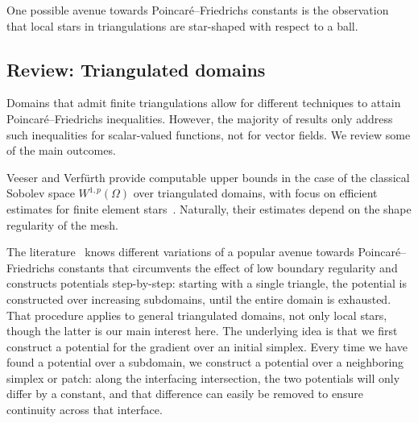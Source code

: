 One possible avenue towards Poincar\'e--Friedrichs constants is the observation that local stars in triangulations are star-shaped with respect to a ball.









\subsection{Review: Triangulated domains}

Domains that admit finite triangulations allow for different techniques to attain Poincar\'e--Friedrichs inequalities. 
However, the majority of results only address such inequalities for scalar-valued functions, not for vector fields. 
We review some of the main outcomes. 

Veeser and Verf\"urth provide computable upper bounds in the case of the classical Sobolev space $W^{1,p}(\Omega)$ over triangulated domains, with focus on efficient estimates for finite element stars~\cite{veeser2012poincare}. Naturally, their estimates depend on the shape regularity of the mesh.

The literature~\cite{Eym_Gal_Her_00,vohralik2005discrete,ern2020stable,ern2021finite,Chaum_Voh_p_rob_3D_H_curl_23,Voh_loc_glob_H1_24} knows different variations of a popular avenue towards Poincar\'e--Friedrichs constants that circumvents the effect of low boundary regularity and constructs potentials step-by-step: 
starting with a single triangle, the potential is constructed over increasing subdomains, until the entire domain is exhausted. 
That procedure applies to general triangulated domains, not only local stars, though the latter is our main interest here. 
The underlying idea is that we first construct a potential for the gradient over an initial simplex. 
Every time we have found a potential over a subdomain, we construct a potential over a neighboring simplex or patch:
along the interfacing intersection, the two potentials will only differ by a constant, 
and that difference can easily be removed to ensure continuity across that interface. 

